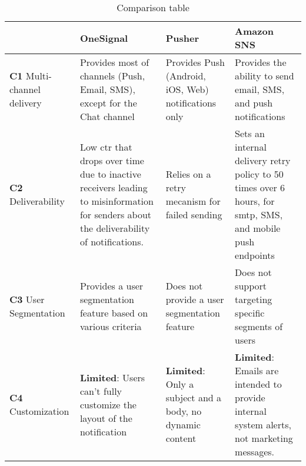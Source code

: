 \begin{table}[hbt!]
      \centering
      \caption{Comparison table}
      \begin{tabularx}{\textwidth}{ |
                  >{\raggedright\arraybackslash} X |
                  >{\raggedright\arraybackslash} X |
                  >{\raggedright\arraybackslash} X |
                  >{\raggedright\arraybackslash} X |
            }
            \hline
                                                          & \textbf{OneSignal}                                                                                                                                & \textbf{Pusher}                                                                & \textbf{Amazon SNS}                                                                                                 \\
            \hline
            \textbf{C1} \linebreak Multi-channel delivery & Provides most of channels (Push, Email, SMS), except for the Chat channel                                                                         & Provides Push (Android, iOS, Web) notifications only                           & Provides the ability to send email, SMS, and push notifications                                                     \\
            \hline
            \textbf{C2} \linebreak Deliverability         & Low \acrfull{ctr} that drops over time due to inactive receivers leading to misinformation for senders about the deliverability of notifications. & Relies on a retry mecanism for failed sending                                  & Sets an internal delivery retry policy to 50 times over 6 hours, for \acrfull{smtp}, SMS, and mobile push endpoints \\
            \hline
            \textbf{C3} \linebreak User Segmentation      & Provides a user segmentation feature based on various criteria                                                                                    & Does not provide a user segmentation feature                                   & Does not support targeting specific segments of users                                                               \\
            \hline
            \textbf{C4} \linebreak Customization          & \textbf{Limited}: Users can’t fully customize the layout of the notification                                                                      & \textbf{Limited}: Only a subject and a body, no dynamic content                & \textbf{Limited}: Emails are intended to provide internal system alerts, not marketing messages.                    \\

\end{tabularx}
\end{table}
